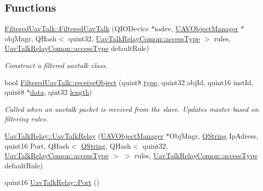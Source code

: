 \subsection*{Functions}
\begin{DoxyCompactItemize}
\item 
\hyperlink{group___u_a_v_talk_ga618403abe72042a54b38faa22c1c5e5f}{Filtered\-Uav\-Talk\-::\-Filtered\-Uav\-Talk} (Q\-I\-O\-Device $\ast$iodev, \hyperlink{class_u_a_v_object_manager}{U\-A\-V\-Object\-Manager} $\ast$obj\-Mngr, Q\-Hash$<$ quint32, \hyperlink{group___u_a_v_talk_plugin_gae73e1677650d617d825cf2224fa0626a}{Uav\-Talk\-Relay\-Comon\-::access\-Type} $>$ rules, \hyperlink{group___u_a_v_talk_plugin_gae73e1677650d617d825cf2224fa0626a}{Uav\-Talk\-Relay\-Comon\-::access\-Type} default\-Rule)
\begin{DoxyCompactList}\small\item\em Construct a filtered uavtalk class. \end{DoxyCompactList}\item 
bool \hyperlink{group___u_a_v_talk_gae0a55c71a396a0577dd48dad6188a7a0}{Filtered\-Uav\-Talk\-::receive\-Object} (quint8 \hyperlink{glext_8h_a7d05960f4f1c1b11f3177dc963a45d86}{type}, quint32 obj\-Id, quint16 inst\-Id, quint8 $\ast$\hyperlink{glext_8h_a8850df0785e6fbcc2351af3b686b8c7a}{data}, qint32 \hyperlink{glext_8h_a3c8469415bbc83dd1341af15c67f1cef}{length})
\begin{DoxyCompactList}\small\item\em Called when an uavtalk packet is received from the slave. Updates master based on filtering rules. \end{DoxyCompactList}\item 
\hyperlink{group___u_a_v_talk_gac8b1e7722bbeccbae7c3dcea8d1fe222}{Uav\-Talk\-Relay\-::\-Uav\-Talk\-Relay} (\hyperlink{class_u_a_v_object_manager}{U\-A\-V\-Object\-Manager} $\ast$Obj\-Mngr, \hyperlink{group___u_a_v_objects_plugin_gab9d252f49c333c94a72f97ce3105a32d}{Q\-String} Ip\-Adress, quint16 Port, Q\-Hash$<$ \hyperlink{group___u_a_v_objects_plugin_gab9d252f49c333c94a72f97ce3105a32d}{Q\-String}, Q\-Hash$<$ quint32, \hyperlink{group___u_a_v_talk_plugin_gae73e1677650d617d825cf2224fa0626a}{Uav\-Talk\-Relay\-Comon\-::access\-Type} $>$ $>$ rules, \hyperlink{group___u_a_v_talk_plugin_gae73e1677650d617d825cf2224fa0626a}{Uav\-Talk\-Relay\-Comon\-::access\-Type} default\-Rule)
\item 
quint16 \hyperlink{group___u_a_v_talk_gaa880d4612e6112e7a8c320cca690f31a}{Uav\-Talk\-Relay\-::\-Port} ()
\item 

\end{DoxyCompactItemize}

